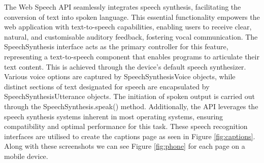 \documentclass{l4proj}
\begin{document}
The Web Speech API seamlessly integrates speech synthesis, facilitating the conversion of text into spoken language. This essential functionality empowers the web application with text-to-speech capabilities, enabling users to receive clear, natural, and customisable auditory feedback, fostering vocal communication. The SpeechSynthesis interface acts as the primary controller for this feature, representing a text-to-speech component that enables programs to articulate their text content. This is achieved through the device's default speech synthesizer. Various voice options are captured by SpeechSynthesisVoice objects, while distinct sections of text designated for speech are encapsulated by SpeechSynthesisUtterance objects. The initiation of spoken output is carried out through the SpeechSynthesis.speak() method. Additionally, the API leverages the speech synthesis systems inherent in most operating systems, ensuring compatibility and optimal performance for this task. These speech recognition interfaces are utilised to create the captions page as seen in Figure \ref{fig:captions}. Along with these screenshots we can see Figure \ref{fig:phone} for each page on a mobile device.
\end{document}
